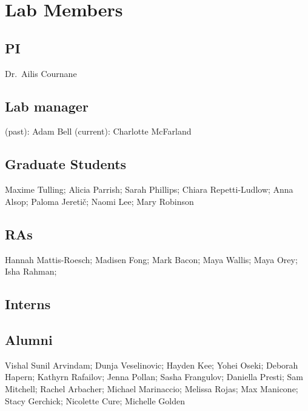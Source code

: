\documentclass[
]{book}
\begin{document}
\hypertarget{lab-members}{%
\section{Lab Members}\label{lab-members}}

\hypertarget{pi}{%
\subsection*{PI}\label{pi}}

Dr.~Ailis Cournane

\hypertarget{lab-manager}{%
\subsection*{Lab manager}\label{lab-manager}}

(past): Adam Bell
(current): Charlotte McFarland

\hypertarget{graduate-students}{%
\subsection*{Graduate Students}\label{graduate-students}}

Maxime Tulling; Alicia Parrish; Sarah Phillips; Chiara Repetti-Ludlow; Anna Alsop; Paloma Jeretič; Naomi Lee; Mary Robinson

\hypertarget{ras}{%
\subsection*{RAs}\label{ras}}

Hannah Mattis-Roesch; Madisen Fong; Mark Bacon; Maya Wallis; Maya Orey; Isha Rahman;

\hypertarget{interns}{%
\subsection*{Interns}\label{interns}}

\hypertarget{alumni}{%
\subsection*{Alumni}\label{alumni}}

Vishal Sunil Arvindam; Dunja Veselinovic; Hayden Kee; Yohei Oseki; Deborah Hapern; Kathyrn Rafailov; Jenna Pollan; Sasha Frangulov; Daniella Presti; Sam Mitchell; Rachel Arbacher; Michael Marinaccio; Melissa Rojas; Max Manicone; Stacy Gerchick; Nicolette Cure; Michelle Golden
\end{document}
